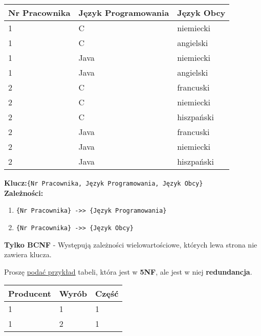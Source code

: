 \begin{center}
    \begin{tabular}{|l|l|l|}
        \hline
        \textbf{Nr Pracownika} &
        \textbf{Język Programowania} &
        \textbf{Język Obcy}\\
        \hline
        1 & C & niemiecki \\
        \hline
        1 & C & angielski \\
        \hline
        1 & Java & niemiecki \\
        \hline
        1 & Java & angielski \\
        \hline
        2 & C & francuski \\
        \hline
        2 & C & niemiecki \\
        \hline
        2 & C & hiszpański \\
        \hline
        2 & Java & francuski \\
        \hline
        2 & Java & niemiecki \\
        \hline
        2 & Java & hiszpański \\
        \hline
    \end{tabular}
\end{center}

\vskip 0.5cm

\textbf{Klucz:}\texttt{\{Nr Pracownika, Język Programowania, Język Obcy\}}\\
\textbf{Zależności:}
\begin{enumerate}
    \item \texttt{\{Nr Pracownika\} ->> \{Język Programowania\}}
    \item \texttt{\{Nr Pracownika\} ->> \{Język Obcy\}}
\end{enumerate}

\begin{tcolorbox}
    \textbf{Tylko BCNF} - Występują zależności wielowartościowe, których lewa
    strona nie zawiera klucza.
\end{tcolorbox}

\pagebreak

\horrule{0.5pt}
Proszę \underline{podać przykład} tabeli, która jest w \textbf{5NF},
ale jest w niej \textbf{redundancja}.\\
\horrule{0.5pt}

\vskip 0.5cm

\begin{center}
    \begin{tabular}{|l|l|l|}
        \hline
        \textbf{Producent} &
        \textbf{Wyrób} &
        \textbf{Część}\\
        \hline
        1 & 1 & 1 \\
        \hline
        1 & 2 & 1 \\
        \hline
    \end{tabular}
\end{center}

